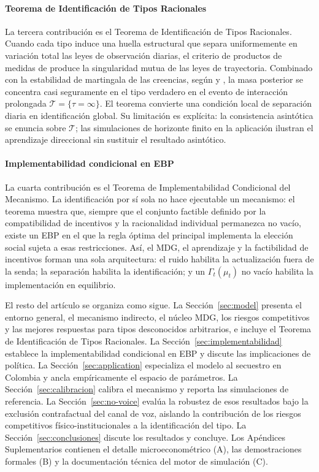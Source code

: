 \documentclass[review,authoryear,12pt]{elsarticle}
\theoremstyle{plain}
\theoremstyle{definition}
\newcommand{\1}{\mathbf{1}}
\begin{document}
\paragraph{Teorema de Identificación de Tipos Racionales}
La tercera contribución es el Teorema de Identificación de Tipos Racionales. Cuando cada tipo induce una huella estructural que separa uniformemente en variación total las leyes de observación diarias, el criterio de productos de medidas de \citet{Kakutani1948} produce la singularidad mutua de las leyes de trayectoria. Combinado con la estabilidad de martingala de las creencias, según \citet{Doob1953Stochastic} y \citet{BlackwellDubins1962}, la masa posterior se concentra casi seguramente en el tipo verdadero en el evento de interacción prolongada $\mathcal{T}=\{\tau=\infty\}$. El teorema convierte una condición local de separación diaria en identificación global. Su limitación es explícita: la consistencia asintótica se enuncia sobre $\mathcal{T}$; las simulaciones de horizonte finito en la aplicación ilustran el aprendizaje direccional sin sustituir el resultado asintótico.

\paragraph{Implementabilidad condicional en EBP}
La cuarta contribución es el Teorema de Implementabilidad Condicional del Mecanismo. La identificación por sí sola no hace ejecutable un mecanismo: el teorema muestra que, siempre que el conjunto factible definido por la compatibilidad de incentivos y la racionalidad individual permanezca no vacío, existe un EBP en el que la regla óptima del principal implementa la elección social sujeta a esas restricciones. Así, el MDG, el aprendizaje y la factibilidad de incentivos forman una sola arquitectura: el ruido habilita la actualización fuera de la senda; la separación habilita la identificación; y un $\Gamma_t(\mu_t)$ no vacío habilita la implementación en equilibrio.

El resto del artículo se organiza como sigue. La Sección~\ref{sec:model} presenta el entorno general, el mecanismo indirecto, el núcleo MDG, los riesgos competitivos y las mejores respuestas para tipos desconocidos arbitrarios, e incluye el Teorema de Identificación de Tipos Racionales. La Sección~\ref{sec:implementabilidad} establece la implementabilidad condicional en EBP y discute las implicaciones de política. La Sección~\ref{sec:application} especializa el modelo al secuestro en Colombia y ancla empíricamente el espacio de parámetros. La Sección~\ref{sec:calibracion} calibra el mecanismo y reporta las simulaciones de referencia. La Sección~\ref{sec:no-voice} evalúa la robustez de esos resultados bajo la exclusión contrafactual del canal de voz, aislando la contribución de los riesgos competitivos físico-institucionales a la identificación del tipo. La Sección~\ref{sec:conclusiones} discute los resultados y concluye. Los Apéndices Suplementarios contienen el detalle microeconométrico (A), las demostraciones formales (B) y la documentación técnica del motor de simulación (C).
\end{document}
